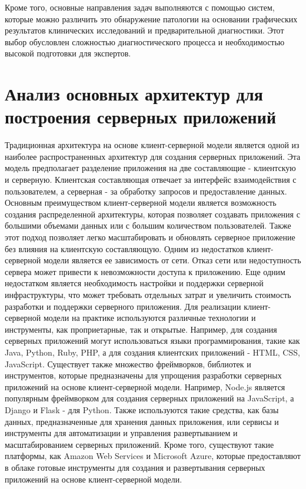 Кроме того, основные направления задач выполняются с помощью систем, которые можно различить это обнаружение патологии на основании графических результатов клинических исследований и предварительной диагностики. Этот выбор обусловлен сложностью диагностического процесса и необходимостью высокой подготовки для экспертов.\\


\section{Анализ основных архитектур для построения серверных приложений}

Традиционная архитектура на основе клиент-серверной модели является одной из наиболее распространенных архитектур для создания серверных приложений. Эта модель предполагает разделение приложения на две составляющие - клиентскую и серверную. Клиентская составляющая отвечает за интерфейс взаимодействия с пользователем, а серверная - за обработку запросов и предоставление данных.
Основным преимуществом клиент-серверной модели является возможность создания распределенной архитектуры, которая позволяет создавать приложения с большими объемами данных или с большим количеством пользователей. Также этот подход позволяет легко масштабировать и обновлять серверное приложение без влияния на клиентскую составляющую.
Одним из недостатков клиент-серверной модели является ее зависимость от сети. Отказ сети или недоступность сервера может привести к невозможности доступа к приложению. Еще одним недостатком является необходимость настройки и поддержки серверной инфраструктуры, что может требовать отдельных затрат и увеличить стоимость разработки и поддержки серверного приложения.
Для реализации клиент-серверной модели на практике используются различные технологии и инструменты, как проприетарные, так и открытые. Например, для создания серверных приложений могут использоваться языки программирования, такие как Java, Python, Ruby, PHP, а для создания клиентских приложений - HTML, CSS, JavaScript.
Существует также множество фреймворков, библиотек и инструментов, которые предназначены для упрощения разработки серверных приложений на основе клиент-серверной модели. Например, Node.js является популярным фреймворком для создания серверных приложений на JavaScript, а Django и Flask - для Python.
Также используются такие средства, как базы данных, предназначенные для хранения данных приложения, или сервисы и инструменты для автоматизации и управления развертыванием и масштабированием серверных приложений. Кроме того, существуют такие платформы, как Amazon Web Services и Microsoft Azure, которые предоставляют в облаке готовые инструменты для создания и развертывания серверных приложений на основе клиент-серверной модели.

